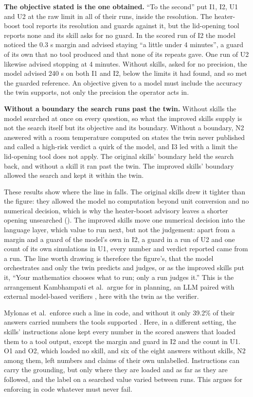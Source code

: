   \textbf{The objective stated is the one obtained.} ``To the second'' put I1, I2, U1 and U2 at
  the raw limit in all of their runs, inside the resolution. The heater-boost tool reports its
  resolution and guards against it, but the lid-opening tool reports none and its skill asks for
  no guard. In the scored run of I2 the model noticed the 0.3 s margin and advised
  staying ``a little under 4 minutes'', a guard of its own that no tool produced and that none of its
  repeats gave. One run of U2 likewise advised stopping at 4 minutes. Without skills, asked for no precision, the model advised 240 s on both
  I1 and I2, below the limits it had found, and so met the guarded reference. An objective given
  to a model must include the accuracy the twin supports, not only the precision the operator
  acts in.

  \textbf{Without a boundary the search runs past the twin.} Without skills the model searched at
  once on every question, so what the improved skills supply is not the search itself but its objective and its
  boundary. Without a boundary, N2 answered with a room temperature computed on states the twin never
  published and called a high-risk verdict a quirk of the model, and I3 led with a limit the
  lid-opening tool does not apply. The original skills' boundary held the search back, and without
  a skill it ran past the twin. The improved skills' boundary allowed the search and kept it
  within the twin.

  These results show where the line in  falls. The original skills drew it
  tighter than the figure: they allowed the model no computation beyond unit conversion and no
  numerical decision, which is why the heater-boost advisory leaves a shorter opening unsearched
  (). The improved skills move one numerical decision into the language layer,
  which value to run next, but not the judgement: apart from a margin and a guard of the model's own in
  I2, a guard in a run of U2 and one count of its own simulations in U1, every number and verdict reported
  came from a run. The line worth drawing is therefore the figure's, that the
  model orchestrates and only the twin predicts and judges, or as the improved skills put it,
  ``Your mathematics chooses what to run; only a run judges it.'' This is the arrangement Kambhampati et
  al.\ argue for in planning, an LLM paired with external model-based verifiers
  \cite{kambhampati2024llmmodulo}, here with the twin as the verifier.

  Mylonas et al.\ enforce such a line in code, and without it only 39.2\% of their answers carried
  numbers the tools supported \cite{mylonas2026governance}. Here, in a different setting, the
  skills' instructions alone kept every number in the scored answers that loaded them to a tool
  output, except the margin and guard in I2 and the count in U1. O1 and O2, which loaded no skill,
  and six of the eight answers without skills, N2 among them, left numbers and claims of their own
  unlabelled. Instructions can carry the grounding, but only where they are loaded and as far as
  they are followed, and the label on a searched value varied between runs. This argues for
  enforcing in code whatever must never fail.

